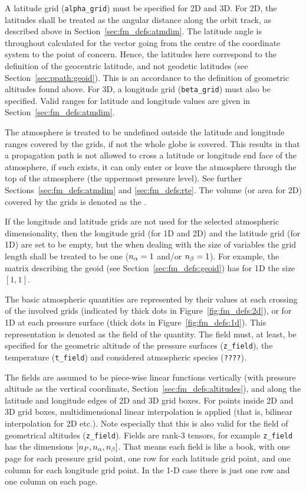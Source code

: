 A latitude grid (\verb|alpha_grid|) must be specified for 2D and 3D.
For 2D, the latitudes shall be treated as the angular distance along
the orbit track, as described above in
Section~\ref{sec:fm_defs:atmdim}.  The latitude angle is throughout
calculated for the vector going from the centre of the coordinate
system to the point of concern. Hence, the latitudes here correspond
to the definition of the geocentric latitude, and not geodetic
latitudes (see Section~\ref{sec:ppath:geoid}). This is an accordance
to the definition of geometric altitudes found above. 
For 3D, a longitude grid (\verb|beta_grid|) must also be specified.
Valid ranges for latitude and longitude values are given in
Section~\ref{sec:fm_defs:atmdim}. 

The atmosphere is treated to be undefined outside the latitude and
longitude ranges covered by the grids, if not the whole globe is
covered. This results in that a propagation path is not allowed to
cross a latitude or longitude end face of the atmosphere, if such
exists, it can only enter or leave the atmosphere through the top of
the atmosphere (the uppermost pressure level). See further
Sections~\ref{sec:fm_defs:atmdim} and \ref{sec:fm_defs:rte}. The
volume (or area for 2D) covered by the grids is denoted as the
.

If the longitude and latitude grids are not used for the selected
atmospheric dimensionality, then the longitude grid (for 1D and 2D)
and the latitude grid (for 1D) are set to be empty, but the when
dealing with the size of variables the grid length shall be treated to
be one ($n_{\alpha}=1$ and/or $n_{\beta}=1$). For example,
the matrix describing the geoid (see Section~\ref{sec:fm_defs:geoid})
has for 1D the size $[1,1]$.

The basic atmospheric quantities are represented by their values at
each crossing of the involved grids (indicated by thick dots in
Figure~\ref{fig:fm_defs:2d}), or for 1D at each pressure surface
(thick dots in Figure~\ref{fig:fm_defs:1d}). This representation is
denoted as the field of the quantity. The field must, at least, be
specified for the geometric altitude of the pressure surfaces
(\verb|z_field|), the temperature (\verb|t_field|) and considered
atmospheric species (\verb|????|).

The fields are assumed to be piece-wise linear functions vertically
(with pressure altitude as the vertical coordinate,
Section~\ref{sec:fm_defs:altitudes}), and along the latitude and
longitude edges of 2D and 3D grid boxes. For points inside 2D and 3D
grid boxes, multidimensional linear interpolation is applied (that is,
bilinear interpolation for 2D etc.). Note especially that this is also
valid for the field of geometrical altitudes (\verb|z_field|).  Fields
are rank-3 tensors, for example \verb|z_field| has the dimensions
$[n_{P},n_{\alpha},n_{\beta}]$.  That means each
field is like a book, with one page for each pressure grid point, one
row for each latitude grid point, and one column for each longitude
grid point. In the 1-D case there is just one row and one column on each
page.



